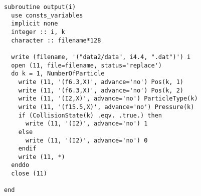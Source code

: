 \begin{lstlisting}[caption=ファイル出力用ルーチン]
subroutine output(i)
  use consts_variables
  implicit none
  integer :: i, k
  character :: filename*128

  write (filename, '("data2/data", i4.4, ".dat")') i
  open (11, file=filename, status='replace')
  do k = 1, NumberOfParticle
    write (11, '(f6.3,X)', advance='no') Pos(k, 1)
    write (11, '(f6.3,X)', advance='no') Pos(k, 2)
    write (11, '(I2,X)', advance='no') ParticleType(k)
    write (11, '(f15.5,X)', advance='no') Pressure(k)
    if (CollisionState(k) .eqv. .true.) then
      write (11, '(I2)', advance='no') 1
    else
      write (11, '(I2)', advance='no') 0
    endif
    write (11, *)
  enddo
  close (11)

end
\end{lstlisting}